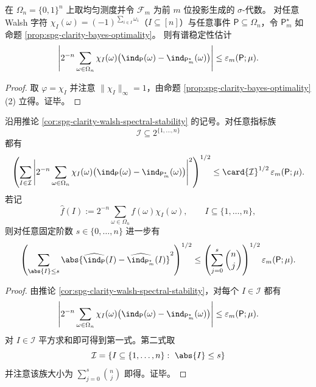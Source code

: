 \begin{corollary}\label{cor:spg-clarity-walsh-spectral-stability}
在 \(\Omega_n=\{0,1\}^n\) 上取均匀测度并令 \(\mathcal F_m\) 为前 \(m\) 位投影生成的 \(\sigma\)-代数。
对任意 Walsh 字符 \(\chi_I(\omega)=(-1)^{\sum_{i\in I}\omega_i}\)（\(I\subseteq[n]\)）与任意事件 \(\mathsf P\subseteq\Omega_n\)，令 \(\mathsf P_m^\star\) 如命题 \ref{prop:spg-clarity-bayes-optimality}。
则有谱稳定性估计
\[
\left|2^{-n}\sum_{\omega\in\Omega_n}\chi_I(\omega)\bigl(\ind_{\mathsf P}(\omega)-\ind_{\mathsf P_m^\star}(\omega)\bigr)\right|
\le \varepsilon_m(\mathsf P;\mu).
\]
\end{corollary}
\begin{proof}
取 \(\varphi=\chi_I\) 并注意 \(\|\chi_I\|_\infty=1\)，由命题 \ref{prop:spg-clarity-bayes-optimality}(2) 立得。证毕。
\end{proof}

\begin{corollary}\label{cor:spg-clarity-walsh-family-stability}
沿用推论 \ref{cor:spg-clarity-walsh-spectral-stability} 的记号。对任意指标族
\[
\mathcal I\subseteq 2^{\{1,\dots,n\}}
\]
都有
\[
\left(
\sum_{I\in\mathcal I}
\left|
2^{-n}\sum_{\omega\in\Omega_n}
\chi_I(\omega)\bigl(\ind_{\mathsf P}(\omega)-\ind_{\mathsf P_m^\star}(\omega)\bigr)
\right|^2
\right)^{1/2}
\le
\card{\mathcal I}^{1/2}\,\varepsilon_m(\mathsf P;\mu).
\]
若记
\[
\widehat f(I):=2^{-n}\sum_{\omega\in\Omega_n}f(\omega)\chi_I(\omega),
\qquad I\subseteq\{1,\dots,n\},
\]
则对任意固定阶数 \(s\in\{0,\dots,n\}\) 进一步有
\[
\left(
\sum_{\abs{I}\le s}
\abs{\widehat{\ind_{\mathsf P}}(I)-\widehat{\ind_{\mathsf P_m^\star}}(I)}^2
\right)^{1/2}
\le
\left(\sum_{j=0}^{s}\binom{n}{j}\right)^{1/2}\varepsilon_m(\mathsf P;\mu).
\]
\end{corollary}
\begin{proof}
由推论 \ref{cor:spg-clarity-walsh-spectral-stability}，对每个 \(I\in\mathcal I\) 都有
\[
\left|
2^{-n}\sum_{\omega\in\Omega_n}
\chi_I(\omega)\bigl(\ind_{\mathsf P}(\omega)-\ind_{\mathsf P_m^\star}(\omega)\bigr)
\right|
\le
\varepsilon_m(\mathsf P;\mu).
\]
对 \(I\in\mathcal I\) 平方求和即可得到第一式。第二式取
\[
\mathcal I=\{I\subseteq\{1,\dots,n\}:\ \abs{I}\le s\}
\]
并注意该族大小为 \(\sum_{j=0}^{s}\binom{n}{j}\) 即得。证毕。
\end{proof}

\endinput
